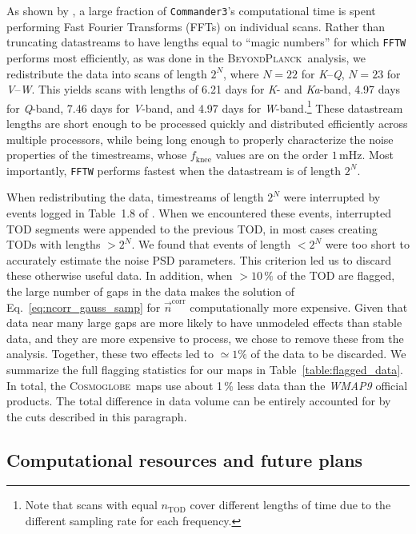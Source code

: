 \documentclass[twocolumn]{../../common/aa}
\def\commanderthree{\texttt{Commander3}}
\newcommand{\bp}{\textsc{BeyondPlanck}}
\newcommand{\Cosmoglobe}{\textsc{Cosmoglobe}}
\newcommand{\K}[0]{\textit K}
\newcommand{\Ka}[0]{\textit{Ka}}
\newcommand{\Q}[0]{\textit Q}
\newcommand{\V}[0]{\textit V}
\newcommand{\W}[0]{\textit W}
\newcommand{\ncorr}{\vec n^\mathrm{corr}}
\begin{document}
As shown by \citet{bp03}, a large fraction of \commanderthree's computational time is spent performing Fast Fourier Transforms (FFTs) on individual scans. Rather than truncating datastreams to have lengths equal to ``magic numbers'' for which \texttt{FFTW} \citep{FFTW05} performs most efficiently, as was done in the \bp\ analysis, 
we redistribute the data into scans of length $2^N$, where $N=22$ for \K--\Q, $N=23$ for \V--\W. This yields scans with lengths of 6.21 days for \K- and \Ka-band, 4.97 days for \Q-band, 7.46 days for \V-band, and 4.97 days for \W-band.\footnote{Note that scans with equal $n_\mathrm{TOD}$ cover different lengths of time due to the different sampling rate for each frequency.}
These datastream lengths are short enough to be processed quickly and distributed efficiently across multiple processors, while being long enough to properly characterize the noise properties of the timestreams, whose $f_\mathrm{knee}$ values are on the order $1\,\mathrm{mHz}$. Most importantly, \texttt{FFTW} performs fastest when the datastream is of length $2^N$. 

When redistributing the data, timestreams of length $2^N$ were interrupted by events logged in Table~1.8 of \citet{wmapexsupp}.
When we encountered these events, interrupted TOD segments were appended to the previous TOD, in most cases creating TODs with lengths $>2^N$. We found that events of length $<2^N$ were too short to accurately estimate the noise PSD parameters. This criterion led us to discard these otherwise useful data. In addition, when $>10\,\%$ of the TOD are flagged, the large number of gaps in the data makes the solution of Eq.~\eqref{eq:ncorr_gauss_samp} for $\ncorr$ computationally more expensive. Given that data near many large gaps are more likely to have unmodeled effects than stable data, and they are more expensive to process, we chose to remove these from the analysis. Together, these two effects led to $\simeq1\%$ of the data to be discarded. We summarize the full flagging statistics for our maps in Table~\ref{table:flagged_data}. In total, the \Cosmoglobe\ maps use about 1\,\% less data than the \textit{WMAP9} official products. The total difference in data volume can be entirely accounted for by the cuts described in this paragraph.





\subsection{Computational resources and future plans}
\label{sec:resources}
\end{document}
